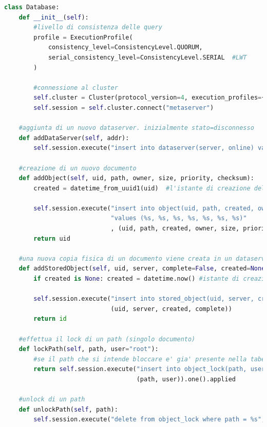 \documentclass[11pt,a4paper,english]{article}
\begin{document}
\begin{lstlisting}[language=Python, title=Codice]
class Database:
    def __init__(self):
  		#livello di consistenza delle query
        profile = ExecutionProfile(
            consistency_level=ConsistencyLevel.QUORUM,
            serial_consistency_level=ConsistencyLevel.SERIAL  #LWT
        )
		
		#connessione al cluster
        self.cluster = Cluster(protocol_version=4, execution_profiles={EXEC_PROFILE_DEFAULT: profile})
        self.session = self.cluster.connect("metaserver")

	#aggiunta di un nuovo dataserver. inizialmente stato=disconnesso
    def addDataServer(self, addr):
        self.session.execute("insert into dataserver(server, online) values (%s, false)", (addr, ))

	#creazione di un nuovo documento
    def addObject(self, uid, path, owner, size, priority, checksum):
        created = datetime_from_uuid1(uid)  #l'istante di creazione del documento coincide con l'istante di creazione del suo uid
        
        self.session.execute("insert into object(uid, path, created, owner, size, priority, checksum) "
                             "values (%s, %s, %s, %s, %s, %s, %s)"
                             , (uid, path, created, owner, size, priority, checksum))
        return uid

	#una nuova copia fisica di un documento viene creata in un dataserver
    def addStoredObject(self, uid, server, complete=False, created=None):
        if created is None: created = datetime.now() #istante di creazione della replica, non del documento
        
        self.session.execute("insert into stored_object(uid, server, created, complete) values (%s, %s, %s, %s)",
                             (uid, server, created, complete))
        return id

	#effettua il lock di un path (singolo documento)
    def lockPath(self, path, user="root"):
    	#se il path che si intende bloccare e' gia' presente nella tabella, il constraint INSERT IF NOT EXISTS fallisce e applied viene settato a False (altrimenti True)
        return self.session.execute("insert into object_lock(path, user) values (%s, %s) if not exists",
                                    (path, user)).one().applied

	#unlock di un path
    def unlockPath(self, path):
        self.session.execute("delete from object_lock where path = %s", (path, ))


\end{lstlisting}
\end{document}
